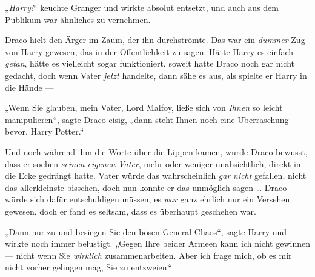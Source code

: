 „\emph{Harry!}“ keuchte Granger und wirkte absolut entsetzt, und auch aus dem Publikum war ähnliches zu vernehmen.

Draco hielt den Ärger im Zaum, der ihn durchströmte. Das war ein \emph{dummer} Zug von Harry gewesen, das in der Öffentlichkeit zu sagen. Hätte Harry es einfach \emph{getan}, hätte es vielleicht sogar funktioniert, soweit hatte Draco noch gar nicht gedacht, doch wenn Vater \emph{jetzt} handelte, dann sähe es aus, als spielte er Harry in die Hände —

„Wenn Sie glauben, mein Vater, Lord Malfoy, ließe sich von \emph{Ihnen} so leicht manipulieren“, sagte Draco eisig, „dann steht Ihnen noch eine Überraschung bevor, Harry Potter.“

Und noch während ihm die Worte über die Lippen kamen, wurde Draco bewusst, dass er soeben \emph{seinen eigenen Vater}, mehr oder weniger unabsichtlich, direkt in die Ecke gedrängt hatte. Vater würde das wahrscheinlich \emph{gar} \emph{nicht} gefallen, nicht das allerkleinste bisschen, doch nun konnte er das unmöglich sagen … Draco würde sich dafür entschuldigen müssen, es \emph{war} ganz ehrlich nur ein Versehen gewesen, doch er fand es seltsam, dass es überhaupt geschehen war.

„Dann nur zu und besiegen Sie den bösen General Chaos“, sagte Harry und wirkte noch immer belustigt.
„Gegen Ihre beider Armeen kann ich nicht gewinnen — nicht wenn Sie \emph{wirklich} zusammenarbeiten. Aber ich frage mich, ob es mir nicht vorher gelingen mag, Sie zu entzweien.“

